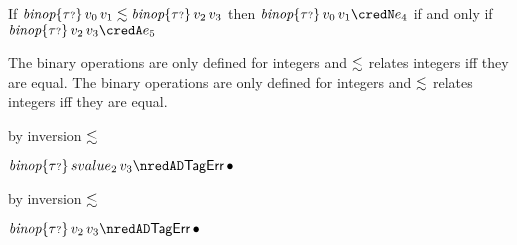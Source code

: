 \begin{lemma}\label{HA-binop}
  If\/ $\textit{binop}{\{{\tau{\scriptstyle ?}}\}}\,v_0\,v_1 \lesssim \textit{binop}{\{{\tau{\scriptstyle ?}}\}}\,v_2\,v_3$
  then\/ ${\ebinopt{\stoptional}{\svalue_0}{\svalue_1}} \credN \sexpr_4$
  if and only if\/ ${\ebinopt{\stoptional}{\svalue_2}{\svalue_3}} \credA \sexpr_5$
\end{lemma}{
  \newcommand{\shortpf}{The binary operations are only defined for integers and $\srexpr$ relates integers iff they are equal.}
\begin{lamportproof*}
  \shortpf
\mainproof
  \shortpf

    \begin{pfproof}
        \begin{pfproof}
            \begin{pfproof}
              by inversion $\lesssim$
            \end{pfproof}
          \qedstep
            \begin{pfproof}
              $\ebinopt{\stoptional}{svalue_2}{\svalue_3} \nredAD \tagerrorD$
            \end{pfproof}
        \end{pfproof}
        \begin{pfproof}
            \begin{pfproof}
              by inversion $\lesssim$
            \end{pfproof}
          \qedstep
            \begin{pfproof}
              $\ebinopt{\stoptional}{\svalue_2}{\svalue_3} \nredAD \tagerrorD$
            \end{pfproof}
        \end{pfproof}
    \end{pfproof}


\end{lamportproof*}}
